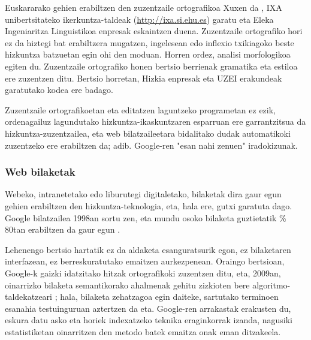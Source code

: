 \begin{multicols}{2}

Euskararako gehien erabiltzen den zuzentzaile ortografikoa Xuxen da \cite{BAS-Nota24}, IXA unibertsitateko ikerkuntza-taldeak (\url{http://ixa.si.ehu.es}) garatu eta Eleka Ingeniaritza Linguistikoa enpresak eskaintzen duena. Zuzentzaile ortografiko hori ez da hiztegi bat erabiltzera mugatzen, ingelesean edo inflexio txikiagoko beste hizkuntza batzuetan egin ohi den moduan. Horren ordez, analisi morfologikoa egiten du. Zuzentzaile ortografiko honen bertsio berrienak gramatika eta estiloa ere zuzentzen ditu. Bertsio horretan, Hizkia \cite{BAS-Nota25} enpresak eta UZEI \cite{BAS-Nota26}  erakundeak garatutako kodea ere badago. 

Zuzentzaile ortografikoetan eta editatzen laguntzeko programetan ez ezik, ordenagailuz lagundutako hizkuntza-ikaskuntzaren esparruan ere garrantzitsua da hizkuntza-zuzentzailea, eta web bilatzaileetara bidalitako dudak automatikoki zuzentzeko ere erabiltzen da; adib. Google-ren "esan nahi zenuen" iradokizunak. 

\subsubsection{Web bilaketak}
   Webeko, intranetetako edo liburutegi digitaletako, bilaketak dira gaur egun gehien erabiltzen den hizkuntza-teknologia, eta, hala ere, gutxi garatuta dago. Google bilatzailea 1998an sortu zen, eta mundu osoko bilaketa guztietatik \% 80tan erabiltzen da gaur egun \cite{BAS-Nota27}. 

Lehenengo bertsio hartatik ez da aldaketa esanguratsurik egon, ez bilaketaren interfazean, ez berreskuratutako emaitzen aurkezpenean. Oraingo bertsioan, Google-k gaizki idatzitako hitzak ortografikoki zuzentzen ditu, eta, 2009an, oinarrizko bilaketa semantikorako ahalmenak gehitu zizkioten bere algoritmo-taldekatzeari \cite{BAS-Nota28} ; hala, bilaketa zehatzagoa egin daiteke, sartutako terminoen esanahia testuinguruan aztertzen da eta. Google-ren arrakastak erakusten du, eskura datu asko eta horiek indexatzeko teknika eraginkorrak izanda, nagusiki estatistiketan oinarritzen den metodo batek emaitza onak eman ditzakeela. 



\end{multicols}
